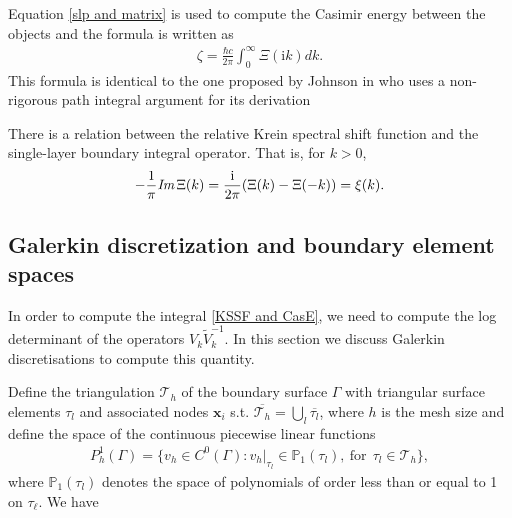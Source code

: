 Equation \eqref{slp and matrix} is used to compute the Casimir energy between the objects and the formula is written as
\begin{align}\label{KSSF and CasE}
    \zeta = \frac{\hbar c}{2\pi}\int_{0}^{\infty}\Xi(\mathrm{i}k)dk.
\end{align}
This formula is identical to the one proposed by Johnson in \cite{reid2009efficient} who uses a non-rigorous path integral argument for its derivation

\begin{remark}
    There is a relation between the relative Krein spectral shift function and the single-layer boundary integral operator. That is,
    for $k > 0$, 
    \begin{align*}
        -\frac{1}{\pi}\emph{\text{Im}}\,\Xi(k) = \frac{\mathrm{i}}{2\pi}(\Xi(k) - \Xi(-k)) = \xi(k).
    \end{align*}
\end{remark}



\subsection{Galerkin discretization and boundary element spaces}
In order to compute the integral \eqref{KSSF and CasE}, we need to compute the log determinant of the operators $V_{k}\tilde{V}_{k}^{-1}$. In this section we discuss Galerkin discretisations to compute this quantity.

Define the 
triangulation $\mathcal{T}_{h}$ of the boundary surface $\Gamma$ with triangular surface elements $\tau_{l}$ and associated nodes $\boldsymbol{x}_{i}$ 
s.t. $\overline{\mathcal{T}_{h}} = \bigcup_{l}\overline{\tau_{l}}$, where $h$ is the mesh size and define the space of the continuous piecewise linear functions
\begin{align*}
    P_{h}^{1}(\Gamma) = \{v_{h}\in C^{0}(\Gamma): v_{h}|_{\tau_{l}}\in\mathbb{P}_{1}(\tau_{l}), \ \text{for} \ \ \tau_{l}\in\mathcal{T}_{h}\},
\end{align*}
where $\mathbb{P}_{1}(\tau_{l})$ denotes the space of polynomials of order less than or equal to 1 on $\tau_{\ell}$. We have

